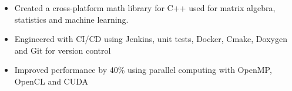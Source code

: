 \documentclass[11pt,a4paper,ragged2e]{altacv}
\begin{document}
\begin{paracol}{1}

\begin{itemize}
\item Created a cross-platform math library for C++ used for matrix algebra, statistics and machine learning.
\item Engineered with CI/CD using Jenkins, unit tests, Docker, Cmake, Doxygen and Git for version control
\item Improved performance by 40\% using parallel computing with OpenMP, OpenCL and CUDA
\end{itemize}

\tightdivider







\end{paracol}
\end{document}
